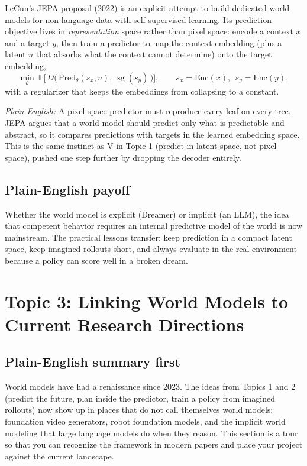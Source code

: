\documentclass[11pt]{article}
\newcommand{\E}{\mathbb{E}}
\theoremstyle{remark}
\newcommand{\plain}[1]{\medskip\noindent\textit{Plain English:} #1\medskip}
\newcommand{\sg}{\operatorname{sg}}
\begin{document}
LeCun's JEPA proposal (2022) is an explicit attempt to build dedicated world models for non-language data with self-supervised learning. Its prediction objective lives in \emph{representation} space rather than pixel space: encode a context $x$ and a target $y$, then train a predictor to map the context embedding (plus a latent $u$ that absorbs what the context cannot determine) onto the target embedding,
\begin{equation}
  \min_{\theta}\ \E\Big[\, D\big(\, \mathrm{Pred}_\theta(s_x, u),\ \sg(s_y)\,\big) \Big],
  \qquad s_x = \mathrm{Enc}(x),\ \ s_y = \mathrm{Enc}(y),
  \label{eq:jepa}
\end{equation}
with a regularizer that keeps the embeddings from collapsing to a constant.

\plain{A pixel-space predictor must reproduce every leaf on every tree. JEPA argues that a world model should predict only what is predictable and abstract, so it compares predictions with targets in the learned embedding space. This is the same instinct as V in Topic 1 (predict in latent space, not pixel space), pushed one step further by dropping the decoder entirely.}

\subsection*{Plain-English payoff}

Whether the world model is explicit (Dreamer) or implicit (an LLM), the idea that competent behavior requires an internal predictive model of the world is now mainstream. The practical lessons transfer: keep prediction in a compact latent space, keep imagined rollouts short, and always evaluate in the real environment because a policy can score well in a broken dream.

\section{Topic 3: Linking World Models to Current Research Directions}

\subsection*{Plain-English summary first}

World models have had a renaissance since 2023. The ideas from Topics 1 and 2 (predict the future, plan inside the predictor, train a policy from imagined rollouts) now show up in places that do not call themselves world models: foundation video generators, robot foundation models, and the implicit world modeling that large language models do when they reason. This section is a tour so that you can recognize the framework in modern papers and place your project against the current landscape.
\end{document}
